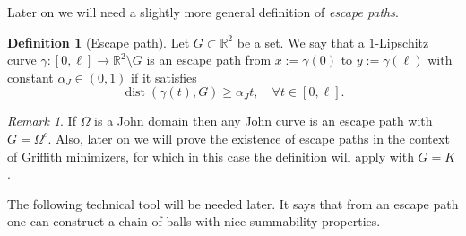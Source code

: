 \documentclass[12pt]{article}
\theoremstyle{definition}
\newtheorem{definition}[theorem]{Definition}
\theoremstyle{remark}
\newtheorem{remark}[theorem]{Remark}
\numberwithin{equation}{section}
\DeclareMathOperator{\dist}{dist}
\newcommand{\R}{\mathbb{R}}
\begin{document}
Later on we will need a slightly more general definition of \emph{escape paths}.

\begin{definition}[Escape path] 
    Let $G\subset \R^2$ be a set.
    We say that  a  $1$-Lipschitz curve
    $\gamma:[0,\ell] \longrightarrow \R^2 \setminus G$ is an escape path from $x:=\gamma(0)$ to $y:=\gamma(\ell)$ with constant $\alpha_J \in (0,1)$ if it satisfies
    \begin{equation}\label{JohnConditionK}
        \dist(\gamma(t),G)\geq \alpha_J t,\quad \forall t \in [0,\ell].
    \end{equation}
\end{definition}

\begin{remark} If $\Omega$ is a John domain then any John curve is an escape path with $G=\Omega^c$. Also, later on we will prove the existence of escape paths in the context of Griffith minimizers, for which in this case the definition will apply with $G=K$. 
\end{remark}


The following technical tool will be needed later. It says that from an escape path one can construct a chain of balls
with nice summability properties.
\end{document}
